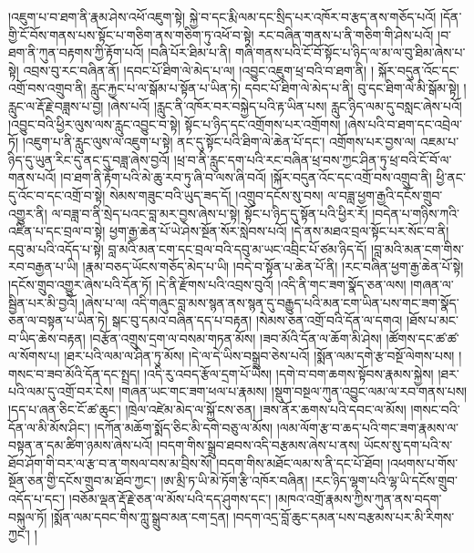 །འཇུག་པ་བ་ཐག་ནི་རྣམ་ཤེས་འཕོ་འཇུག་སྟེ། སྐྱེ་བ་དང་རྨི་ལམ་དང་སྲིད་པར་འཁོར་བ་རྩད་ནས་གཅོད་པའོ། །དོན་གྱི་ངོ་བོས་གནས་པས་སྟོང་པ་གཅིག་ནས་གཅིག་ཏུ་འཕོ་བ་སྟེ། རང་བཞིན་གནས་པ་ནི་གཅིག་གི་ཤེས་པའོ། །བ་ཐག་ནི་ཀུན་བརྟགས་ཀྱི་རྟོག་པའོ། །བཞི་པོར་ཐིམ་པ་ནི། གཞི་གནས་པའི་ངོ་བོ་སྟོང་པ་ཉིད་ལ་མ་ལ་བུ་ཐིམ་ཞེས་པ་སྟེ། འབྲས་བུ་རང་བཞིན་ནོ། །དབང་པོ་ཐིག་ལེ་མེད་པ་ལ། །འབྱུང་འཇུག་ཕྲ་བའི་བ་ཐག་ནི། །
སྐོར་བདུན་འོང་དང་འགྲོ་བས་འགྲུབ་ནི། རླུང་རྐྱང་པ་ལ་སྒོམ་པ་སྟོན་པ་ཡིན་ཏེ། དབང་པོ་ཐིག་ལེ་མེད་པ་ནི། བུ་དང་ཐིག་ལེ་མི་སྒོམ་སྟེ། །རླུང་ལ་རྡོ་རྗེ་བཟླས་པ་བྱ། །ཞེས་པའོ། །རླུང་ནི་འཁོར་བར་བསྐྱེད་པའི་རྟ་ཡིན་པས། རླུང་ཉིད་ལམ་དུ་བསླང་ཞེས་པའོ། །འབྱུང་བའི་ཕྱིར་ལུས་ལས་རླུང་འབྱུང་བ་སྟེ། སྟོང་པ་ཉིད་དང་འགྲོགས་པར་འགྲོགས། །ཞེས་པའི་བ་ཐག་དང་འབྲེལ་ཏོ། །འཇུག་པ་ནི་རླུང་ལུས་ལ་འཇུག་པ་སྟེ། ནང་དུ་སྟོང་པའི་ཐིག་ལེ་ཆེན་པོ་དང་། འགྲོགས་པར་བྱས་ལ། འཇམ་པ་ཉིད་དུ་ཡུན་རིང་དུ་ནང་དུ་བཟླ་ཞེས་བྱའོ། །ཕྲ་བ་ནི་རླུང་དག་པའི་རང་བཞིན་ཕྲ་བས་ཀྱང་ཤིན་ཏུ་ཕྲ་བའི་ངོ་བོ་ལ་གནས་པའོ། །བ་ཐག་ནི་རྟོག་པའི་མེ་ཆུ་རབ་ཏུ་ཞི་བ་ལས་ཞི་བའོ། །སྐོར་བདུན་འོང་དང་འགྲོ་བས་འགྲུབ་ནི། ཕྱི་ནང་དུ་འོང་བ་དང་འགྲོ་བ་སྟེ། སེམས་གཟུང་བའི་ཡུད་ཟད་དོ། །འགྲུབ་དངོས་སུ་བས། ལ་བཟླ་ཕྱག་རྒྱའི་དངོས་གྲུབ་འགྱུར་ནི། ལ་བཟླ་བ་ནི་སྲེད་པའང་བླ་མར་བྱས་ཞེས་པ་སྟེ། སྟོང་པ་ཉིད་དུ་སྟོན་པའི་ཕྱིར་རོ། །བདེན་པ་གཉིས་ཀའི་འཛིན་པ་དང་བྲལ་བ་སྟེ། ཕྱག་རྒྱ་ཆེན་པོ་ཡེ་ཤེས་སྔོན་སོར་སླེབས་པའོ། །དེ་ནས་མཐའ་བྲལ་སྟོང་པར་སོང་བ་ནི། དབུ་མ་པའི་འདོད་པ་སྟེ། བླ་མའི་མན་ངག་དང་བྲལ་བའི་དབུ་མ་ཡང་འབྲིང་པོ་ཙམ་ཉིད་དོ། །བླ་མའི་མན་ངག་གིས་རབ་བརྒྱན་པ་ཡི། །རྣམ་བཅད་ཡོངས་གཅོད་མེད་པ་ཡི། །བདེ་བ་སྟོན་པ་ཆེན་པོ་ནི། །རང་བཞིན་ཕྱག་རྒྱ་ཆེན་པོ་སྟེ། །དངོས་གྲུབ་འགྱུར་ཞེས་པའི་དོན་ཏོ། །དེ་ནི་རྫོགས་པའི་འབྲས་བུའོ། །འདི་ནི་གང་ཟག་སྣོད་ཅན་ལས། །གཞན་ལ་སྦྱིན་པར་མི་བྱའོ། །ཞེས་པ་ལ། འདི་གཞུང་བླ་མས་སྙན་ནས་སྙན་དུ་བརྒྱུད་པའི་མན་ངག་ཡིན་པས་གང་ཟག་སྣོད་ཅན་ལ་བསྟན་པ་ཡིན་ཏེ། སྒང་བུ་དམའ་བཞིན་དད་པ་བརྟན། །སེམས་ཅན་འགྲོ་བའི་དོན་ལ་དགའ། །ཐོས་པ་མང་བ་ཡིད་ཆེས་བརྟན། །བརྩོན་འགྲུས་དྲག་ལ་བསམ་གཏན་མོས། །ཟབ་མོའི་དོན་ལ་ཆོག་མི་ཤེས། །ཚོགས་དང་ཚ་ཚ་ལ་སོགས་པ། །ཐར་པའི་ལམ་ལ་ཤིན་ཏུ་མོས། །དེ་ལ་དེ་ཡིས་བསྒྲུབ་ཅེས་པའོ། །སྨོན་ལམ་དགེ་རྩ་བསྔོ་ལེགས་པས། །གསང་བ་ཟབ་མོའི་དོན་དང་སྤྲད། །འདི་རུ་འབད་རྩོལ་དྲག་པོ་ཡིས། །དགེ་བ་བག་ཆགས་སྟོབས་རྣམས་སྐྱེས། །ཐར་པའི་ལམ་དུ་འགྲོ་བར་ངེས། །གཞན་ཡང་གང་ཟག་ཕལ་པ་རྣམས། །སྡུག་བསྔལ་ཀུན་འབྱུང་ལམ་ལ་རབ་གནས་པས། །དད་པ་ཞན་ཅིང་ངོ་ཚ་ཆུང་། །ཁྲེལ་འཛེམ་མེད་ལ་སྐྱོ་ངས་ཅན། །ཟས་ནོར་ཆགས་པའི་དབང་ལ་མོས། །གསང་བའི་དོན་ལ་མི་མོས་ཤིང་། །དཀོན་མཆོག་སྨོད་ཅིང་མི་དགེ་བཅུ་ལ་མོས། །ལམ་ལོག་རྩ་བ་ཆད་པའི་གང་ཟག་རྣམས་ལ་བསྟན་ན་དམ་ཚིག་ཉམས་ཞེས་པའོ། །བདག་གིས་སྒྲུབ་ཐབས་འདི་བརྩམས་ཞེས་པ་ནས། ཡོངས་སུ་དག་པའི་ས་ཐོབ་ཤོག་གི་བར་ལ་རྩ་བ་ན་གསལ་བས་མ་བྲིས་སོ། །བདག་གིས་མཐོང་ལམ་ས་ནི་དང་པོ་ཐོབ། །འཕགས་པ་གོས་སྔོན་ཅན་གྱི་དངོས་གྲུབ་མ་ཐོབ་ཀྱང་། །ཨ་མྲི་ཏ་ཡི་མེ་ཏོག་རྩི་འཁོར་བཞིན། །རང་ཉིད་ལྷག་པའི་ལྷ་ཡི་དངོས་གྲུབ་འདོད་པ་དང་། །བཅོམ་ལྡན་རྡོ་རྗེ་ཅན་ལ་མོས་པའི་དད་ཤུགས་དང་། །མཁའ་འགྲོ་རྣམས་ཀྱིས་ཀུན་ནས་བདག་བསྐུལ་ཏོ། །སྨོན་ལམ་དབང་གིས་ཀླུ་སྒྲུབ་མན་ངག་དྲན། །བདག་འདྲ་བློ་ཆུང་དམན་པས་བརྩམས་པར་མི་རིགས་ཀྱང་། །
